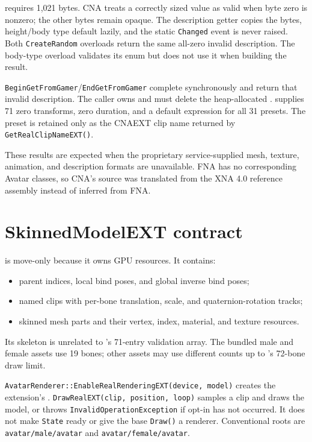  requires 1,021 bytes. CNA treats a correctly sized value as valid
when byte zero is nonzero; the other bytes remain opaque. The description getter copies the
bytes, height/body type default lazily, and the static \texttt{Changed} event is never raised.
Both \texttt{CreateRandom} overloads return the same all-zero invalid description. The body-type
overload validates its enum but does not use it when building the result.

\texttt{BeginGetFromGamer}/\texttt{EndGetFromGamer} complete synchronously and return that
invalid description. The caller owns and must delete the heap-allocated
.  supplies 71 zero transforms, zero duration,
and a default expression for all 31 presets. The preset is retained only as the CNAEXT clip name
returned by \texttt{GetRealClipNameEXT()}.

These results are expected when the proprietary service-supplied mesh, texture, animation, and
description formats are unavailable. FNA has no corresponding Avatar classes, so CNA's source
was translated from the XNA 4.0 reference assembly instead of inferred from FNA.

\section{SkinnedModelEXT contract}

 is move-only because it owns GPU resources. It contains:

\begin{itemize}
  \item parent indices, local bind poses, and global inverse bind poses;
  \item named clips with per-bone translation, scale, and quaternion-rotation tracks;
  \item skinned mesh parts and their vertex, index, material, and texture resources.
\end{itemize}

Its skeleton is unrelated to 's 71-entry validation array. The
bundled male and female assets use 19 bones; other assets may use different counts up to
's 72-bone draw limit.

\texttt{AvatarRenderer::EnableRealRenderingEXT(device, model)} creates the extension's
. \texttt{DrawRealEXT(clip, position, loop)} samples a clip and draws
the model, or throws \texttt{InvalidOperationException} if opt-in has not occurred. It does not
make \texttt{State} ready or give the base \texttt{Draw()} a renderer. Conventional roots are
\texttt{avatar/male/avatar} and \texttt{avatar/female/avatar}.

